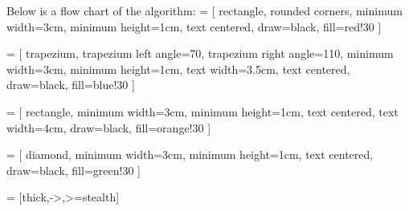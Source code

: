 \documentclass[12pt]{report}
\begin{document}
\clearpage

Below is a flow chart of the algorithm:
 = [
    rectangle,
    rounded corners,
    minimum width=3cm,
    minimum height=1cm,
    text centered,
    draw=black,
    fill=red!30
]

 = [
    trapezium,
    trapezium left angle=70,
    trapezium right angle=110,
    minimum width=3cm,
    minimum height=1cm,
    text width=3.5cm,
    text centered,
    draw=black,
    fill=blue!30
]

 = [
    rectangle,
    minimum width=3cm,
    minimum height=1cm,
    text centered,
    text width=4cm,
    draw=black,
    fill=orange!30
]

 = [
    diamond,
    minimum width=3cm,
    minimum height=1cm,
    text centered,
    draw=black,
    fill=green!30
]

 = [thick,->,>=stealth]
\end{document}
